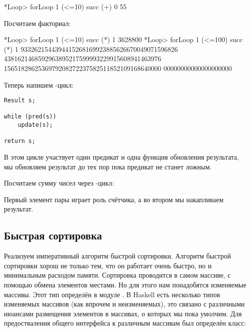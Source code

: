 \begin{code}
*Loop> forLoop 1 (<=10) succ (+) 0
55
\end{code}

Посчитаем факториал:


\begin{code}
*Loop> forLoop 1 (<=10) succ (*) 1
3628800
*Loop> forLoop 1 (<=100) succ (*) 1
9332621544394415268169923885626670049071596826
4381621468592963895217599993229915608941463976
1565182862536979208272237582511852109168640000
00000000000000000000
\end{code}

Теперь напишем -цикл:

\begin{verbatim}
Result s;

while (pred(s))
    update(s);

return s;
\end{verbatim}

В этом цикле участвует один предикат и одна функция обновления
результата, мы обновляем результат до тех пор пока предикат не станет
ложным.



Посчитаем сумму чисел через -цикл:



Первый элемент пары играет роль счётчика, а во втором мы накапливаем
результат.

\subsection{Быстрая сортировка}

Реализуем императивный алгоритм быстрой сортировки. Алгоритм быстрой
сортировки хорош не только тем, что он работает очень быстро, но и
минимальным расходом памяти. Сортировка проводится в самом массиве, с
помощью обмена элементов местами. Но для этого нам понадобятся
изменяемые массивы. Этот тип определён в модуле . В
Haskell есть несколько типов изменяемых массивов (как впрочем и
неизменяемых), это связано с различными нюансами размещения элементов в
массивах, о которых мы пока умолчим. Для предостваления общего
интерфейса к различным массивам был определён класс:


